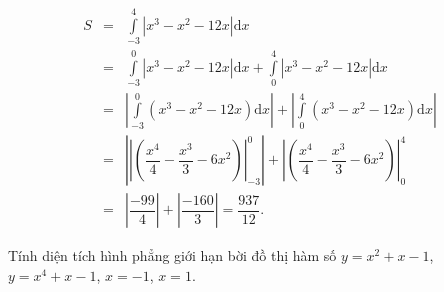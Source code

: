 \begin{ex}
{\begin{itemchoice}
\begin{eqnarray*}
	S&=&\displaystyle\int\limits_{-3}^4\left|x^3-x^2-12x\right| \mathrm{d}x
	\\&=&\displaystyle\int\limits_{-3}^0\left|x^3-x^2-12x\right| \mathrm{d}x+\displaystyle\int\limits_0^4\left|x^3-x^2-12 x\right| \mathrm{d}x 
	\\&=&\left|\displaystyle\int\limits_{-3}^0\left(x^3-x^2-12 x\right) \mathrm{d}x\right|+\left|\displaystyle\int\limits_0^4\left(x^3-x^2-12 x\right) \mathrm{d}x\right|
	\\&=&\left| \left|\left(\dfrac{x^4}{4}-\dfrac{x^3}{3}-6 x^2\right)\right|_{-3}^0\right| +\left| \left(\dfrac{x^4}{4}-\dfrac{x^3}{3}-6 x^2\right)\right|_0^4
	\\&=&\left|\dfrac{-99}{4}\right|+\left|\dfrac{-160}{3}\right|=\dfrac{937}{12}.
\end{eqnarray*}

\end{itemchoice}
}
\end{ex}

\begin{ex}%
	Tính diện tích hình phẳng giới hạn bời đồ thị hàm số $y=x^2+x-1$, $y=x^4+x-1$, $x=-1$, $x=1$.
\end{ex}

